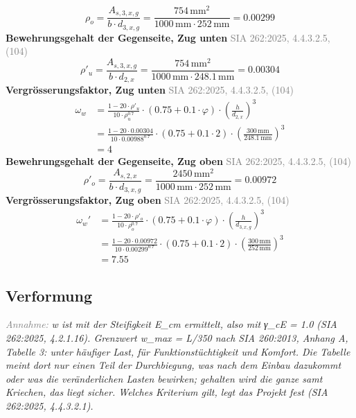 \documentclass[11pt,a4paper]{article}
\newcommand{\normref}[1]{{\small\textcolor{gray}{#1}}}
\newcommand{\hinweis}[2]{\par\noindent\textcolor{gray}{\textit{#1:}} \textit{#2}\par}
\begin{document}
\begin{equation*}
\rho_{o} = \frac{A_{s,3,x,g}}{b \cdot d_{3,x,g}} = \frac{754\,\mathrm{mm}^{2}}{1000\,\mathrm{mm} \cdot 252\,\mathrm{mm}} = 0.00299
\end{equation*}
\noindent\textbf{Bewehrungsgehalt der Gegenseite, Zug unten} \hfill \normref{SIA 262:2025, 4.4.3.2.5, (104)}
\begin{equation*}
\rho'_{u} = \frac{A_{s,3,x,g}}{b \cdot d_{2,x}} = \frac{754\,\mathrm{mm}^{2}}{1000\,\mathrm{mm} \cdot 248.1\,\mathrm{mm}} = 0.00304
\end{equation*}
\noindent\textbf{Vergrösserungsfaktor, Zug unten} \hfill \normref{SIA 262:2025, 4.4.3.2.5, (104)}
\begin{equation*}
\begin{aligned}
  \omega_w &= \frac{1 - 20 \cdot \rho'_{u}}{10 \cdot \rho_{u}^{0.7}} \cdot \left(0.75 + 0.1 \cdot \varphi\right) \cdot \left(\frac{h}{d_{2,x}}\right)^{3} \\
  &= \frac{1 - 20 \cdot 0.00304}{10 \cdot 0.00988^{0.7}} \cdot \left(0.75 + 0.1 \cdot 2\right) \cdot \left(\frac{300\,\mathrm{mm}}{248.1\,\mathrm{mm}}\right)^{3} \\
  &= 4
\end{aligned}
\end{equation*}
\noindent\textbf{Bewehrungsgehalt der Gegenseite, Zug oben} \hfill \normref{SIA 262:2025, 4.4.3.2.5, (104)}
\begin{equation*}
\rho'_{o} = \frac{A_{s,2,x}}{b \cdot d_{3,x,g}} = \frac{2450\,\mathrm{mm}^{2}}{1000\,\mathrm{mm} \cdot 252\,\mathrm{mm}} = 0.00972
\end{equation*}
\noindent\textbf{Vergrösserungsfaktor, Zug oben} \hfill \normref{SIA 262:2025, 4.4.3.2.5, (104)}
\begin{equation*}
\begin{aligned}
  \omega_w' &= \frac{1 - 20 \cdot \rho'_{o}}{10 \cdot \rho_{o}^{0.7}} \cdot \left(0.75 + 0.1 \cdot \varphi\right) \cdot \left(\frac{h}{d_{3,x,g}}\right)^{3} \\
  &= \frac{1 - 20 \cdot 0.00972}{10 \cdot 0.00299^{0.7}} \cdot \left(0.75 + 0.1 \cdot 2\right) \cdot \left(\frac{300\,\mathrm{mm}}{252\,\mathrm{mm}}\right)^{3} \\
  &= 7.55
\end{aligned}
\end{equation*}
\subsection{Verformung}
\hinweis{Annahme}{w ist mit der Steifigkeit E\_cm ermittelt, also mit γ\_cE = 1.0 (SIA 262:2025, 4.2.1.16). Grenzwert w\_max = L/350 nach SIA 260:2013, Anhang A, Tabelle 3: unter häufiger Last, für Funktionstüchtigkeit und Komfort. Die Tabelle meint dort nur einen Teil der Durchbiegung, was nach dem Einbau dazukommt oder was die veränderlichen Lasten bewirken; gehalten wird die ganze samt Kriechen, das liegt sicher. Welches Kriterium gilt, legt das Projekt fest (SIA 262:2025, 4.4.3.2.1).}
\end{document}
